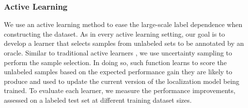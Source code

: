 \documentclass[hidelinks,11pt,a4paper]{report}
\renewcommand{\cite}[1]{\citep{#1}}
\begin{document}
\begin{table}[]
    \small
        \centering
        \caption{\small Distribution of test, train, validation, and the total dataset}
        \label{table:strategy-train-test-val-stats}
    \end{table}



\subsubsection{Active Learning}
We use an active learning method to ease the large-scale label dependence when constructing the dataset. As in every active learning setting, our goal is to develop a learner that selects samples from unlabeled sets to be annotated by an oracle. Similar to traditional active learners \cite{gilad2005query,lewis1994heterogeneous}, we use uncertainty sampling to perform the sample selection. In doing so, such function learns to score the unlabeled samples based on the expected performance gain they are likely to produce and used to update the current version of the localization model being trained. To evaluate each learner, we measure the performance improvements, assessed on a labeled test set at different training dataset sizes.
\end{document}

